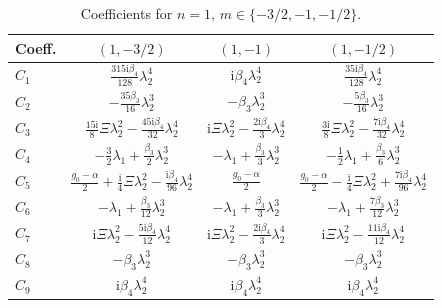 \documentclass[11pt]{article}
\newcommand{\ii}{\mathrm{i}}
\begin{document}
\begin{table}[htbp]
\centering\small
\caption{Coefficients for $n=1$, $m\in\{-3/2,-1,-1/2\}$.}
\begin{tabular}{lccc}
\toprule
Coeff. & $(1,-3/2)$ & $(1,-1)$ & $(1,-1/2)$ \\
\midrule
$C_1$ & $\tfrac{315\ii\beta_4}{128}\lambda_2^4$ & $\ii\beta_4\lambda_2^4$ & $\tfrac{35\ii\beta_4}{128}\lambda_2^4$ \\
$C_2$ & $-\tfrac{35\beta_3}{16}\lambda_2^3$ & $-\beta_3\lambda_2^3$ & $-\tfrac{5\beta_3}{16}\lambda_2^3$ \\
$C_3$ & $\tfrac{15\ii}{8}\Xi\lambda_2^2-\tfrac{45\ii\beta_4}{32}\lambda_2^4$ & $\ii\Xi\lambda_2^2-\tfrac{2\ii\beta_4}{3}\lambda_2^4$ & $\tfrac{3\ii}{8}\Xi\lambda_2^2-\tfrac{7\ii\beta_4}{32}\lambda_2^4$ \\
$C_4$ & $-\tfrac32\lambda_1+\tfrac{\beta_3}{2}\lambda_2^3$ & $-\lambda_1+\tfrac{\beta_3}{3}\lambda_2^3$ & $-\tfrac12\lambda_1+\tfrac{\beta_3}{6}\lambda_2^3$ \\
$C_5$ & $\tfrac{g_0-\alpha}{2}+\tfrac{\ii}{4}\Xi\lambda_2^2-\tfrac{\ii\beta_4}{96}\lambda_2^4$ & $\tfrac{g_0-\alpha}{2}$ & $\tfrac{g_0-\alpha}{2}-\tfrac{\ii}{4}\Xi\lambda_2^2+\tfrac{7\ii\beta_4}{96}\lambda_2^4$ \\
$C_6$ & $-\lambda_1+\tfrac{\beta_3}{12}\lambda_2^3$ & $-\lambda_1+\tfrac{\beta_3}{3}\lambda_2^3$ & $-\lambda_1+\tfrac{7\beta_3}{12}\lambda_2^3$ \\
$C_7$ & $\ii\Xi\lambda_2^2-\tfrac{5\ii\beta_4}{12}\lambda_2^4$ & $\ii\Xi\lambda_2^2-\tfrac{2\ii\beta_4}{3}\lambda_2^4$ & $\ii\Xi\lambda_2^2-\tfrac{11\ii\beta_4}{12}\lambda_2^4$ \\
$C_8$ & $-\beta_3\lambda_2^3$ & $-\beta_3\lambda_2^3$ & $-\beta_3\lambda_2^3$ \\
$C_9$ & $\ii\beta_4\lambda_2^4$ & $\ii\beta_4\lambda_2^4$ & $\ii\beta_4\lambda_2^4$ \\
\bottomrule
\end{tabular}
\end{table}
\end{document}
